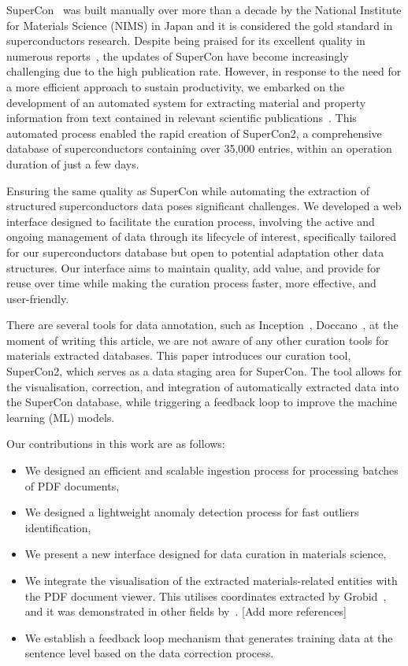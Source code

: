 \documentclass[a4paper]{article}
\begin{document}
SuperCon~\cite{SuperCon} was built manually over more than a decade by the National Institute for Materials Science (NIMS) in Japan and it is considered the gold standard in superconductors research.
Despite being praised for its excellent quality in numerous reports~\cite{roter2020predicting, stanev_machine_2017, tran2022machine, konno2021deep}, the updates of SuperCon have become increasingly challenging due to the high publication rate. However, in response to the need for a more efficient approach to sustain productivity, we embarked on the development of an automated system for extracting material and property information from text contained in relevant scientific publications~\cite{lfoppiano2023automatic}. This automated process enabled the rapid creation of SuperCon2, a comprehensive database of superconductors containing over 35,000 entries, within an operation duration of just a few days. 

Ensuring the same quality as SuperCon while automating the extraction of structured superconductors data poses significant challenges. 
We developed a web interface designed to facilitate the curation process, involving the active and ongoing management of data through its lifecycle of interest, specifically tailored for our superconductors database but open to potential adaptation other data structures. 
Our interface aims to maintain quality, add value, and provide for reuse over time while making the curation process faster, more effective, and user-friendly.

There are several tools for data annotation, such as Inception~\cite{klie-etal-2018-inception}, Doccano~\cite{doccano}, at the moment of writing this article, we are not aware of any other curation tools for materials extracted databases. 
This paper introduces our curation tool, SuperCon2, which serves as a data staging area for SuperCon. The tool allows for the visualisation, correction, and integration of automatically extracted data into the SuperCon database, while triggering a feedback loop to improve the machine learning (ML) models.

Our contributions in this work are as follows:
\begin{itemize}
    \item We designed an efficient and scalable ingestion process for processing batches of PDF documents,
    \item We designed a lightweight anomaly detection process for fast outliers identification, 
    \item We present a new interface designed for data curation in materials science, 
    \item We integrate the visualisation of the extracted materials-related entities with the PDF document viewer. This utilises coordinates extracted by Grobid~\cite{GROBID}, and it was demonstrated in other fields by~\cite{wang2022hammer}. [Add more references] 
    \item We establish a feedback loop mechanism that generates training data at the sentence level based on the data correction process.
\end{itemize}
\end{document}

